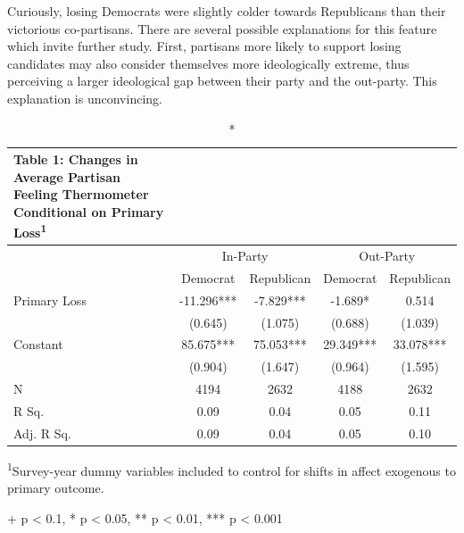\documentclass[
]{article}
\begin{document}
Curiously, losing Democrats were slightly colder towards Republicans than their victorious co-partisans. There are several possible explanations for this feature which invite further study. First, partisans more likely to support losing candidates may also consider themselves more ideologically extreme, thus perceiving a larger ideological gap between their party and the out-party. This explanation is unconvincing.

\clearpage
\captionsetup[table]{labelformat=empty,skip=1pt}
\begin{longtable}{lcccc}
\caption*{
{\large \textbf{Table 1:} Changes in Average Partisan Feeling Thermometer  Conditional on Primary Loss\textsuperscript{1}}
} \\ 
\toprule
 & \multicolumn{2}{c}{In-Party} & \multicolumn{2}{c}{Out-Party} \\ 
 \cmidrule(lr){2-3} \cmidrule(lr){4-5}
  & Democrat & Republican & Democrat  & Republican  \\ 
\midrule
Primary Loss & -11.296*** & -7.829*** & -1.689* & 0.514 \\ 
 & (0.645) & (1.075) & (0.688) & (1.039) \\ 
Constant & 85.675*** & 75.053*** & 29.349*** & 33.078*** \\ 
 & (0.904) & (1.647) & (0.964) & (1.595) \\ 
N & 4194 & 2632 & 4188 & 2632 \\ 
R Sq. & 0.09 & 0.04 & 0.05 & 0.11 \\ 
Adj. R Sq. & 0.09 & 0.04 & 0.05 & 0.10 \\ 
 \bottomrule
\end{longtable}
\vspace{-5mm}
\begin{minipage}{\linewidth}
\textsuperscript{1}Survey-year dummy variables included to  control for shifts in affect exogenous to primary outcome. \\ 
\end{minipage}
\begin{minipage}{\linewidth}
+ p < 0.1, * p < 0.05, ** p < 0.01, *** p < 0.001\\ 
\end{minipage}
\end{document}

